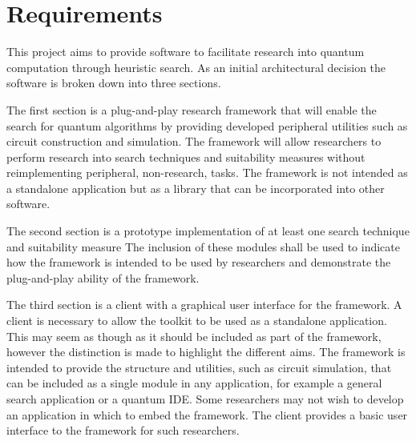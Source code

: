\chapter{Requirements}
\label{sec:reqs}

This project aims to provide software to facilitate research into quantum computation through heuristic search.
As an initial architectural decision the software is broken down into three sections.

The first section is a plug-and-play research framework that will enable the search for quantum algorithms by providing developed peripheral utilities such as circuit construction and simulation.
The framework will allow researchers to perform research into search techniques and suitability measures without reimplementing peripheral, non-research, tasks.
The framework is not intended as a standalone application but as a library that can be incorporated into other software.

The second section is a prototype implementation of at least one search technique and suitability measure
The inclusion of these modules shall be used to indicate how the framework is intended to be used by researchers and demonstrate the plug-and-play ability of the framework.

The third section is a client with a graphical user interface for the framework.
A client is necessary to allow the toolkit to be used as a standalone application.
This may seem as though as it should be included as part of the framework, however the distinction is made to highlight the different aims.
The framework is intended to provide the structure and utilities, such as circuit simulation, that can be included as a single module in any application, for example a general search application or a quantum IDE.
Some researchers may not wish to develop an application in which to embed the framework.
The client provides a basic user interface to the framework for such researchers.


